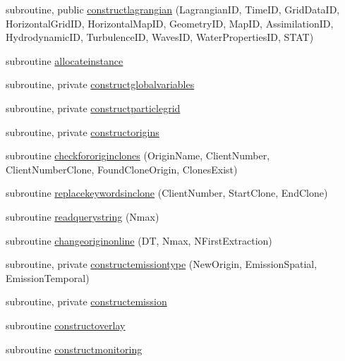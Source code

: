 \begin{DoxyCompactItemize}
\item 
subroutine, public \mbox{\hyperlink{namespacemodulelagrangian_ad766e71e7390a14dd30513d8ec8ca115}{constructlagrangian}} (Lagrangian\+ID, Time\+ID, Grid\+Data\+ID, Horizontal\+Grid\+ID, Horizontal\+Map\+ID, Geometry\+ID, Map\+ID, Assimilation\+ID, Hydrodynamic\+ID, Turbulence\+ID, Waves\+ID, Water\+Properties\+ID, S\+T\+AT)
\item 
subroutine \mbox{\hyperlink{namespacemodulelagrangian_a8223a77ae9396e4ded8f6f220eb1ebe0}{allocateinstance}}
\item 
subroutine, private \mbox{\hyperlink{namespacemodulelagrangian_aadb63f9fca438cc41d82d25d4e841aa6}{constructglobalvariables}}
\item 
subroutine, private \mbox{\hyperlink{namespacemodulelagrangian_a190cd84669e94eedbb0ca723a973969c}{constructparticlegrid}}
\item 
subroutine, private \mbox{\hyperlink{namespacemodulelagrangian_a18d4f1108b3f7cc2ab468c5271bc2a42}{constructorigins}}
\item 
subroutine \mbox{\hyperlink{namespacemodulelagrangian_a80725dbaa881f5358592ca2d92316001}{checkfororiginclones}} (Origin\+Name, Client\+Number, Client\+Number\+Clone, Found\+Clone\+Origin, Clones\+Exist)
\item 
subroutine \mbox{\hyperlink{namespacemodulelagrangian_a6f0ed297af020601a6d8ac70faef5cae}{replacekeywordsinclone}} (Client\+Number, Start\+Clone, End\+Clone)
\item 
subroutine \mbox{\hyperlink{namespacemodulelagrangian_a1d47ba91199ceabdf0bbe9cc584783b7}{readquerystring}} (Nmax)
\item 
subroutine \mbox{\hyperlink{namespacemodulelagrangian_abfb29437c427b37d5253837c1d2b738e}{changeoriginonline}} (DT, Nmax, N\+First\+Extraction)
\item 
subroutine, private \mbox{\hyperlink{namespacemodulelagrangian_a647212013ee98b692308121cf19b0e90}{constructemissiontype}} (New\+Origin, Emission\+Spatial, Emission\+Temporal)
\item 
subroutine, private \mbox{\hyperlink{namespacemodulelagrangian_ac0e529585f9aa6d77944f42eec49c399}{constructemission}}
\item 
subroutine \mbox{\hyperlink{namespacemodulelagrangian_a9c44a52195377ea654c3cd3d5b97acca}{constructoverlay}}
\item 
subroutine \mbox{\hyperlink{namespacemodulelagrangian_af8367c0c93de5218ac9c3ef7159659cf}{constructmonitoring}}

\end{DoxyCompactItemize}
